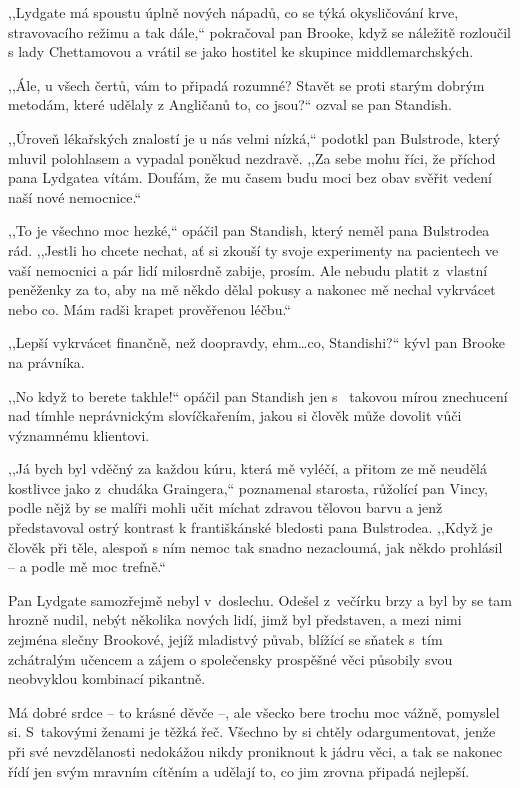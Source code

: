 ,,Lydgate má spoustu úplně nových nápadů, co se týká okysličování krve, stravovacího režimu a tak dále,`` pokračoval pan Brooke, když se náležitě rozloučil s lady Chettamovou a vrátil se jako hostitel ke skupince middlemarchských. 

,,Ále, u všech čertů, vám to připadá rozumné? Stavět se proti starým dobrým metodám, které udělaly z Angličanů to, co jsou?`` ozval se pan Standish. 

,,Úroveň lékařských znalostí je u nás velmi nízká,`` podotkl pan Bulstrode, který mluvil polohlasem a vypadal poněkud nezdravě. ,,Za sebe mohu říci, že příchod pana Lydgatea vítám. Doufám, že mu časem budu moci  bez obav svěřit vedení naší nové nemocnice.``  

,,To je všechno moc hezké,`` opáčil pan Standish, který neměl pana Bulstrodea rád. ,,Jestli ho chcete nechat, ať si zkouší ty svoje experimenty na pacientech ve vaší nemocnici a pár lidí milosrdně zabije, prosím. Ale nebudu platit z vlastní peněženky za to, aby na mě někdo dělal pokusy a nakonec mě nechal vykrvácet nebo co. Mám radši krapet prověřenou léčbu.``             
 
,,Lepší vykrvácet finančně, než doopravdy, ehm\ldots co, Standishi?`` kývl pan Brooke na právníka.

,,No když to berete takhle!`` opáčil pan Standish jen s  takovou mírou znechucení nad tímhle neprávnickým slovíčkařením, jakou si člověk může dovolit vůči významnému klientovi.    

,,Já bych byl vděčný za každou kúru, která mě vyléčí, a přitom ze mě neudělá kostlivce jako z chudáka Graingera,`` poznamenal starosta, růžolící pan Vincy, podle nějž by se malíři mohli učit míchat zdravou tělovou barvu a jenž představoval ostrý kontrast k františkánské bledosti pana Bulstrodea. ,,Když je člověk při těle, alespoň s ním nemoc tak snadno nezacloumá, jak někdo prohlásil -- a podle mě moc trefně.``

Pan Lydgate samozřejmě nebyl v doslechu. Odešel z večírku brzy a byl by se tam hrozně nudil, nebýt několika nových lidí, jimž byl představen, a mezi nimi zejména slečny Brookové, jejíž mladistvý půvab, blížící se sňatek s tím zchátralým učencem a zájem o společensky prospěšné věci působily svou neobvyklou kombinací pikantně.   

Má dobré srdce -- to krásné děvče --, ale všecko bere trochu moc vážně, pomyslel si. S takovými ženami je těžká řeč. Všechno by si chtěly odargumentovat, jenže při své nevzdělanosti nedokážou nikdy proniknout k jádru věci, a tak se nakonec řídí jen svým mravním cítěním a udělají to, co jim zrovna připadá nejlepší.

